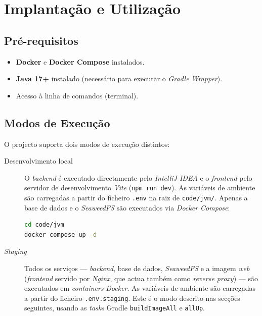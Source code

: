\documentclass[12pt,a4paper]{article}
\begin{document}
\section{Implantação e Utilização}

\subsection{Pré-requisitos}

\begin{itemize}[leftmargin=1.5cm]
  \item \textbf{Docker} e \textbf{Docker Compose} instalados.
  \item \textbf{Java 17+} instalado (necessário para executar o \textit{Gradle Wrapper}).
  \item Acesso à linha de comandos (terminal).
\end{itemize}

\subsection{Modos de Execução}

O projecto suporta dois modos de execução distintos:

\begin{description}
  \item[Desenvolvimento local] O \textit{backend} é executado directamente pelo
        \textit{IntelliJ IDEA} e o \textit{frontend} pelo servidor de desenvolvimento \textit{Vite}
        (\texttt{npm run dev}). As variáveis de ambiente são carregadas
        a partir do ficheiro \texttt{.env} na raiz de \texttt{code/jvm/}.
        Apenas a base de dados e o \textit{SeaweedFS} são executados via \textit{Docker
          Compose}:

        \begin{lstlisting}[language=bash]
cd code/jvm
docker compose up -d
\end{lstlisting}

  \item[\textit{Staging}] Todos os serviços — \textit{backend}, base de dados,
        \textit{SeaweedFS} e a imagem \textit{web} (\textit{frontend} servido por
        \textit{Nginx}, que actua também como \textit{reverse proxy}) — são executados em
        \textit{containers} \textit{Docker}. As variáveis de ambiente são carregadas a partir do
        ficheiro \texttt{.env.staging}. Este é o modo descrito nas
        secções seguintes, usando as \textit{tasks} Gradle \texttt{buildImageAll}
        e \texttt{allUp}.
\end{description}
\end{document}
